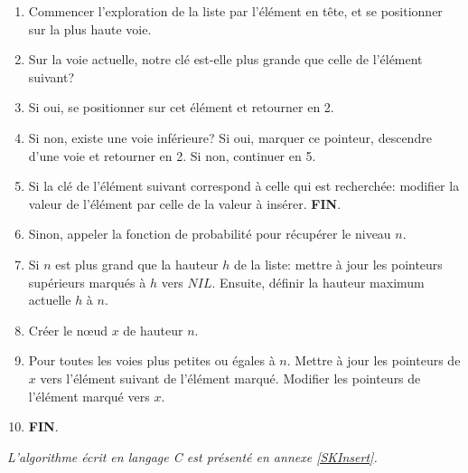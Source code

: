 \documentclass[hidelinks,a4paper, 12pt]{article}
\begin{document}
	\begin{enumerate}
		\item Commencer l'exploration de la liste par l'élément en tête, et se positionner sur la plus haute voie.
		\item Sur la voie actuelle, notre clé est-elle plus grande que celle de l'élément suivant?
		\item Si oui, se positionner sur cet élément et retourner en 2.
		\item Si non, existe une voie inférieure? 
		\subitem Si oui, marquer ce pointeur, descendre d'une voie et retourner en 2.
		\subitem Si non, continuer en 5.
		\subitem 
		\item Si la clé de l'élément suivant correspond à celle qui est recherchée: modifier la valeur de l'élément par celle de la valeur à insérer. \textbf{FIN}.
		\item Sinon, appeler la fonction de probabilité pour récupérer le niveau $n$.
		
		\item Si $n$ est plus grand que la hauteur $h$ de la liste: mettre à jour les pointeurs supérieurs marqués à $h$ vers $NIL$. Ensuite, définir la hauteur maximum actuelle $h$ à $n$.
		\item Créer le nœud $x$ de hauteur $n$.
		
		\item Pour toutes les voies plus petites ou égales à $n$.
		\subitem  Mettre à jour les pointeurs de $x$ vers l'élément suivant de l'élément marqué. Modifier les pointeurs de l'élément marqué vers $x$.
		
		\item \textbf{FIN}.
	\end{enumerate}
	\emph{L'algorithme écrit en langage C est présenté en annexe \ref{SKInsert}.}
	
	\newpage
\end{document}
